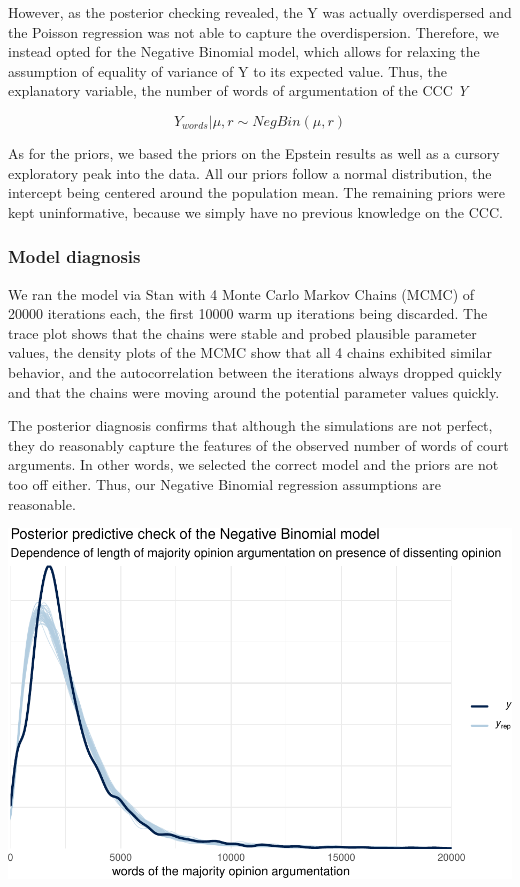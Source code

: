 \documentclass[
  11pt,
]{article}
\begin{document}
However, as the posterior checking revealed, the Y was actually
overdispersed and the Poisson regression was not able to capture the
overdispersion. Therefore, we instead opted for the Negative Binomial
model, which allows for relaxing the assumption of equality of variance
of Y to its expected value. Thus, the explanatory variable, the number
of words of argumentation of the CCC \emph{Y}

\[
Y_{words} | \mu, r \sim NegBin(\mu, r)
\]

As for the priors, we based the priors on the Epstein results as well as
a cursory exploratory peak into the data. All our priors follow a normal
distribution, the intercept being centered around the population mean.
The remaining priors were kept uninformative, because we simply have no
previous knowledge on the CCC.

\hypertarget{model-diagnosis}{%
\subsubsection{Model diagnosis}\label{model-diagnosis}}

We ran the model via Stan with 4 Monte Carlo Markov Chains (MCMC) of
20000 iterations each, the first 10000 warm up iterations being
discarded. The trace plot shows that the chains were stable and probed
plausible parameter values, the density plots of the MCMC show that all
4 chains exhibited similar behavior, and the autocorrelation between the
iterations always dropped quickly and that the chains were moving around
the potential parameter values quickly.

The posterior diagnosis confirms that although the simulations are not
perfect, they do reasonably capture the features of the observed number
of words of court arguments. In other words, we selected the correct
model and the priors are not too off either. Thus, our Negative Binomial
regression assumptions are reasonable.

\includegraphics{dissents_article_appendix_files/figure-latex/pp_check_negbinom-1.pdf}
\end{document}
